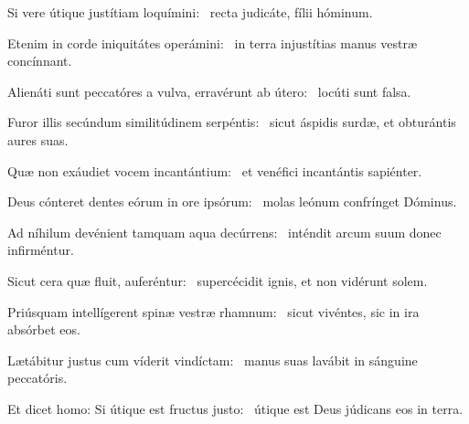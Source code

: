 \item Si vere útique justítiam loquímini:~\psstar{} recta judicáte, fílii hóminum.

\item Etenim in corde iniquitátes operámini:~\psstar{} in terra injustítias manus vestræ concínnant.

\item Alienáti sunt peccatóres a vulva, erravérunt ab útero:~\psstar{} locúti sunt falsa.

\item Furor illis secúndum similitúdinem serpéntis:~\psstar{} sicut áspidis surdæ, et obturántis aures suas.

\item Quæ non exáudiet vocem incantántium:~\psstar{} et venéfici incantántis sapiénter.

\item Deus cónteret dentes eórum in ore ipsórum:~\psstar{} molas leónum confrínget Dóminus.

\item Ad níhilum devénient tamquam aqua decúrrens:~\psstar{} inténdit arcum suum donec infirméntur.

\item Sicut cera quæ fluit, auferéntur:~\psstar{} supercécidit ignis, et non vidérunt solem.

\item Priúsquam intellígerent spinæ vestræ rhamnum:~\psstar{} sicut vivéntes, sic in ira absórbet eos.

\item Lætábitur justus cum víderit vindíctam:~\psstar{} manus suas lavábit in sánguine peccatóris.

\item Et dicet homo: Si útique est fructus justo:~\psstar{} útique est Deus júdicans eos in terra.